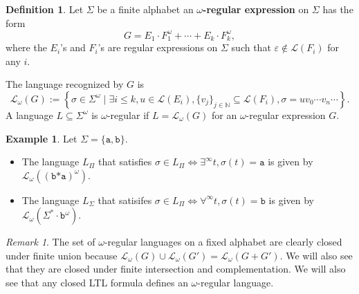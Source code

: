 \documentclass{tufte-handout} %
\theoremstyle{definition}
\newtheorem{defn}[thm]{Definition}
\newtheorem{exmp}[thm]{Example}
\theoremstyle{remark}
\newtheorem{rem}[thm]{Remark}
\newcommand{\N}{\mathbb{N}}
\newcommand{\0}{\textsf{0}}
\newcommand{\1}{\textsf{1}}
\newcommand{\lang}{\mathcal{L}_{\omega}}
\begin{document}
\begin{defn}
	Let $\Sigma$ be a finite alphabet an  $\omega$\textbf{-regular expression} on $\Sigma$ has the form
	\[G = E_1\cdot F_1^{\omega} + \cdots + E_k\cdot F_k^{\omega},\]
	where the $E_i$'s and $F_i$'s are regular expressions on $\Sigma$ such that $\varepsilon \notin \mathcal{L}(F_i)$ for any $i$.%
	
	The language recognized by $G$ is 
	\[\lang(G) := \left\{ \sigma \in \Sigma^{\omega} \mid \exists i \leq k, u \in \mathcal{L}(E_i), \{v_j\}_{j \in \N} \subseteq \mathcal{L}(F_i), \sigma = uv_0\cdots v_n \cdots \right\}.\]
	A language $L \subseteq \Sigma^{\omega}$ is $\omega$-regular if $L = \lang(G)$ for an $\omega$-regular expression $G$.
\end{defn}
\begin{exmp}
	Let $\Sigma = \{\texttt{a}, \texttt{b}\}$.
	\begin{itemize}
		\item The language $L_{\Pi}$ that satisfies $\sigma \in L_{\Pi} \Leftrightarrow \exists^{\infty} t, \sigma(t) = \texttt{a}$ is given by $\lang((\texttt{b*a})^{\omega})$.
		\item The language $L_{\Sigma}$ that satisifes $\sigma \in L_{\Pi} \Leftrightarrow \forall^{\infty} t, \sigma(t) = \texttt{b}$ is given by $\lang(\Sigma^*\cdot \texttt{b}^{\omega})$.
	\end{itemize}
\end{exmp}
\begin{rem}
	The set of $\omega$-regular languages on a fixed alphabet are clearly closed under finite union because $\lang(G) \cup \lang(G') = \lang(G+G')$. We will also see that they are closed under finite intersection and complementation. We will also see that any closed LTL formula defines an $\omega$-regular language.
\end{rem}
\end{document}
